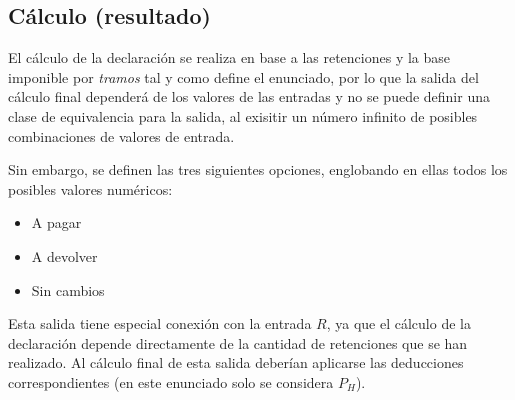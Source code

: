 \subsection{Cálculo (resultado)}
El cálculo de la declaración se realiza en base a las retenciones y la base imponible por \textit{tramos}
tal y como define el enunciado, por lo que la salida del cálculo final dependerá de los valores
de las entradas y no se puede definir una clase de equivalencia para la salida, al exisitir un número
infinito de posibles combinaciones de valores de entrada.

Sin embargo, se definen las tres siguientes opciones, englobando en ellas todos los posibles valores numéricos:
\begin{itemize}
	\item A pagar
	\item A devolver
	\item Sin cambios
\end{itemize}

Esta salida tiene especial conexión con la entrada $R$, ya que el cálculo de la declaración
depende directamente de la cantidad de retenciones que se han realizado. Al cálculo final de esta salida
deberían aplicarse las deducciones correspondientes (en este enunciado solo se considera $P_{H}$).

